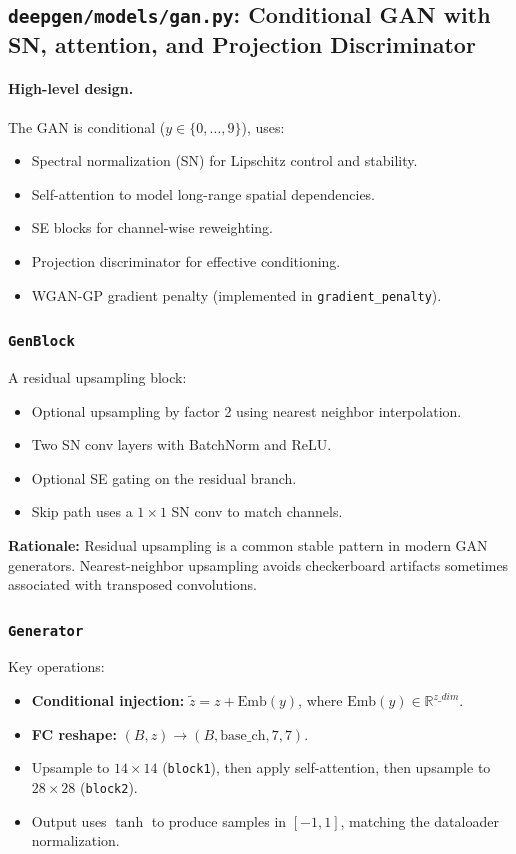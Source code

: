 \subsection{\texttt{deepgen/models/gan.py}: Conditional GAN with SN, attention, and Projection Discriminator}
\label{subsec:code_gan}

\paragraph{High-level design.}
The GAN is conditional (\(y\in\{0,\dots,9\}\)), uses:
\begin{itemize}
  \item Spectral normalization (SN) for Lipschitz control and stability.
  \item Self-attention to model long-range spatial dependencies.
  \item SE blocks for channel-wise reweighting.
  \item Projection discriminator for effective conditioning.
  \item WGAN-GP gradient penalty (implemented in \texttt{gradient\_penalty}).
\end{itemize}

\subsubsection*{\texttt{GenBlock}}
A residual upsampling block:
\begin{itemize}
  \item Optional upsampling by factor 2 using nearest neighbor interpolation.
  \item Two SN conv layers with BatchNorm and ReLU.
  \item Optional SE gating on the residual branch.
  \item Skip path uses a \(1\times 1\) SN conv to match channels.
\end{itemize}
\textbf{Rationale:} Residual upsampling is a common stable pattern in modern GAN generators. Nearest-neighbor upsampling avoids checkerboard artifacts sometimes associated with transposed convolutions.

\subsubsection*{\texttt{Generator}}
Key operations:
\begin{itemize}
  \item \textbf{Conditional injection:} \(\tilde{z} = z + \mathrm{Emb}(y)\), where \(\mathrm{Emb}(y)\in\mathbb{R}^{z\_dim}\).
  \item \textbf{FC reshape:} \((B,z)\rightarrow (B,\text{base\_ch},7,7)\).
  \item Upsample to \(14\times 14\) (\texttt{block1}), then apply self-attention, then upsample to \(28\times 28\) (\texttt{block2}).
  \item Output uses \(\tanh\) to produce samples in \([-1,1]\), matching the dataloader normalization.
\end{itemize}

